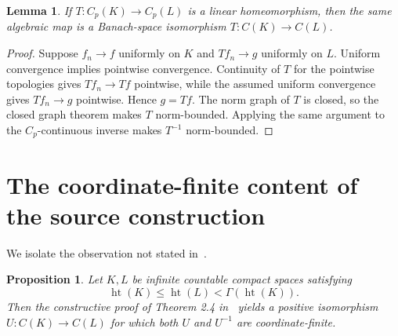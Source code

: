 \documentclass[11pt]{article}
\newtheorem{lemma}[theorem]{Lemma}
\newtheorem{proposition}[theorem]{Proposition}
\newcommand{\C}{C}
\newcommand{\Cp}{C_p}
\newcommand{\htop}{\operatorname{ht}}
\begin{document}
\begin{lemma}\label{lem:closed-graph}
If $T:\Cp(K)\to\Cp(L)$ is a linear homeomorphism, then the same algebraic map
is a Banach-space isomorphism $T:\C(K)\to\C(L)$.
\end{lemma}
\begin{proof}
Suppose $f_n\to f$ uniformly on $K$ and $Tf_n\to g$ uniformly on $L$.
Uniform convergence implies pointwise convergence.  Continuity of $T$ for the
pointwise topologies gives $Tf_n\to Tf$ pointwise, while the assumed uniform
convergence gives $Tf_n\to g$ pointwise.  Hence $g=Tf$.  The norm graph of
$T$ is closed, so the closed graph theorem makes $T$ norm-bounded.  Applying
the same argument to the $C_p$-continuous inverse makes $T^{-1}$ norm-bounded.
\end{proof}

\section{The coordinate-finite content of the source construction}
We isolate the observation not stated in~\cite{CHRS}.

\begin{proposition}\label{prop:source-audit}
Let $K,L$ be infinite countable compact spaces satisfying
\begin{equation}\label{eq:height}
 \htop(K)\leq\htop(L)<\Gamma(\htop(K)).
\end{equation}
Then the constructive proof of Theorem 2.4 in~\cite{CHRS} yields a positive
isomorphism $U:\C(K)\to\C(L)$ for which both $U$ and $U^{-1}$ are
coordinate-finite.
\end{proposition}
\end{document}
